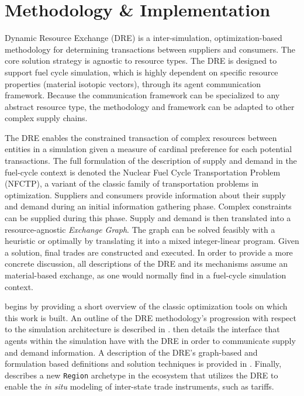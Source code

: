 



\section{Methodology \& Implementation}\label{sec:methods}

Dynamic Resource Exchange (DRE) is a inter-simulation, optimization-based
methodology for determining transactions between suppliers and consumers. The
core solution strategy is agnostic to resource types. The DRE is designed to
support fuel cycle simulation, which is highly dependent on specific resource
properties (material isotopic vectors), through its agent communication
framework. Because the communication framework can be specialized to any
abstract resource type, the methodology and framework can be adapted to other
complex supply chains.

The DRE enables the constrained transaction of complex resources between
entities in a simulation given a measure of cardinal preference for each
potential transactions. The full formulation of the description of supply and
demand in the fuel-cycle context is denoted the Nuclear Fuel Cycle
Transportation Problem (NFCTP), a variant of the classic family of
transportation problems in optimization. Suppliers and consumers provide
information about their supply and demand during an initial information
gathering phase. Complex constraints can be supplied during this phase. Supply
and demand is then translated into a resource-agnostic \textit{Exchange
  Graph}. The graph can be solved feasibly with a heuristic or optimally by
translating it into a mixed integer-linear program. Given a solution, final
trades are constructed and executed. In order to provide a more concrete
discussion, all descriptions of the DRE and its mechanisms assume an
material-based exchange, as one would normally find in a fuel-cycle simulation
context.

 begins by providing a short overview of the
classic optimization tools on which this work is built. An outline of the DRE
methodology's progression with respect to the simulation architecture is
described in .  then details the
interface that agents within the simulation have with the DRE in order to
communicate supply and demand information. A description of the DRE's
graph-based and formulation based definitions and solution techniques is
provided in . Finally,  describes a new
\texttt{Region} archetype in the \Cyclus ecosystem that utilizes the DRE to
enable the \textit{in situ} modeling of inter-state trade instruments, such as
tariffs.

